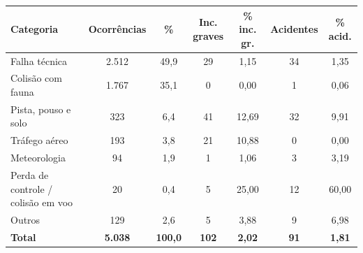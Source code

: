 \begin{tabular}{lcccccc}
\toprule
\textbf{Categoria} & \textbf{Ocorrências} & \textbf{\%} & \textbf{Inc. graves} & \textbf{\% inc. gr.} & \textbf{Acidentes} & \textbf{\% acid.} \\
\midrule
Falha técnica & 2.512 & 49,9 & 29 & 1,15 & 34 & 1,35 \\
Colisão com fauna & 1.767 & 35,1 & 0 & 0,00 & 1 & 0,06 \\
Pista, pouso e solo & 323 & 6,4 & 41 & 12,69 & 32 & 9,91 \\
Tráfego aéreo & 193 & 3,8 & 21 & 10,88 & 0 & 0,00 \\
Meteorologia & 94 & 1,9 & 1 & 1,06 & 3 & 3,19 \\
Perda de controle / colisão em voo & 20 & 0,4 & 5 & 25,00 & 12 & 60,00 \\
Outros & 129 & 2,6 & 5 & 3,88 & 9 & 6,98 \\
\midrule
\textbf{Total} & \textbf{5.038} & \textbf{100,0} & \textbf{102} & \textbf{2,02} & \textbf{91} & \textbf{1,81} \\
\bottomrule
\end{tabular}
